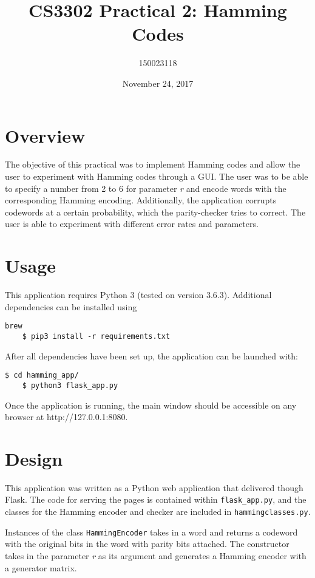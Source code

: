 \documentclass[11pt, oneside]{article}   	%
\title{CS3302 Practical 2: Hamming Codes}
\author{150023118}
\date{November 24, 2017}
\begin{document}
\maketitle
\section*{Overview}

The objective of this practical was to implement Hamming codes and allow the user to experiment with Hamming codes through a GUI. The user was to be able to specify a number from 2 to 6 for parameter \textit{r} and encode words with the corresponding Hamming encoding. Additionally, the application corrupts codewords at a certain probability, which the parity-checker tries to correct. The user is able to experiment with different error rates and parameters. 

\section*{Usage}

This application requires Python 3 (tested on version 3.6.3). Additional dependencies can be installed using

\begin{Verbatim}[tabsize=4]brew 
	$ pip3 install -r requirements.txt
\end{Verbatim}

After all dependencies have been set up, the application can be launched with:

\begin{Verbatim}[tabsize=4]
	$ cd hamming_app/
	$ python3 flask_app.py
\end{Verbatim}

Once the application is running, the main window should be accessible on any browser at http://127.0.0.1:8080. 

\section*{Design}

This application was written as a Python web application that delivered though Flask. The code for serving the pages is contained within \verb!flask_app.py!, and the classes for the Hamming encoder and checker are included in \verb!hammingclasses.py!. 

Instances of the class \verb|HammingEncoder| takes in a word and returns a codeword with the original bits in the word with parity bits attached. The constructor takes in the parameter \textit{r} as its argument and generates a Hamming encoder with a generator matrix.
\end{document}
